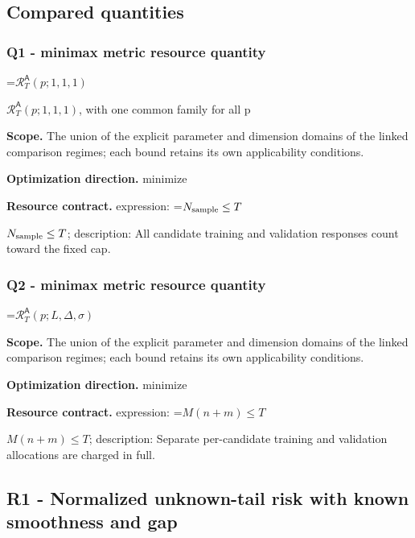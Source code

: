 \documentclass[10pt,a4paper]{article}
\newcommand{\AtlasMath}[1]{\par\begingroup\centering\setbox0=\hbox{$\displaystyle #1$}\ifdim\wd0>1.4\linewidth\typeout{ATLAS WIDE FORMULA: \the\wd0}\fi\ifdim\wd0>\linewidth\resizebox{\linewidth}{!}{\box0}\else\box0\fi\par\endgroup}
\newcommand{\AtlasInlineMath}[1]{\begingroup\setbox0=\hbox{$#1$}\ifdim\wd0>.4\linewidth\endgroup\AtlasMath{#1}\else\endgroup$#1$\fi}
\begin{document}
\subsection{Compared quantities}


\subsubsection{Q1 - minimax metric resource quantity}


\AtlasInlineMath{\mathcal R_T^{\mathsf A}(p;1,1,1)}, with one common family for all p



\textbf{Scope.} The union of the explicit parameter and dimension domains of the linked comparison regimes; each bound retains its own applicability conditions.



\textbf{Optimization direction.} minimize



\textbf{Resource contract.} expression: \AtlasInlineMath{N_{\rm sample}\le T}; description: All candidate training and validation responses count toward the fixed cap.



\subsubsection{Q2 - minimax metric resource quantity}


\AtlasMath{\mathcal R_T^{\mathsf A}(p;L,\Delta,\sigma)}


\textbf{Scope.} The union of the explicit parameter and dimension domains of the linked comparison regimes; each bound retains its own applicability conditions.



\textbf{Optimization direction.} minimize



\textbf{Resource contract.} expression: \AtlasInlineMath{M(n+m)\le T}; description: Separate per-candidate training and validation allocations are charged in full.



\subsection{R1 - Normalized unknown-tail risk with known smoothness and gap}
\end{document}
